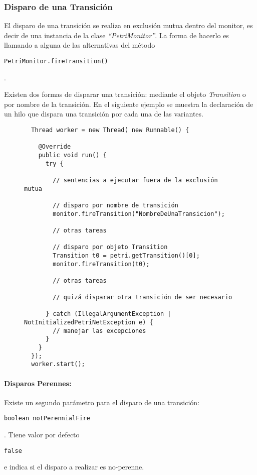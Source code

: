 \subsubsection{Disparo de una Transición}

El disparo de una transición se realiza en exclusión mutua dentro del monitor,
es decir de una instancia de la clase \textit{``PetriMonitor''}. La forma de
hacerlo es llamando a alguna de las alternativas del método
\begin{verbatim}
PetriMonitor.fireTransition()
\end{verbatim}.

Existen dos formas de disparar una transición: mediante el objeto
\textit{Transition} o por nombre de la transición.
En el siguiente ejemplo se muestra la declaración de un hilo que dispara una
transición por cada una de las variantes.

\begin{figure}[H]
\centering
\begin{verbatim}
  Thread worker = new Thread( new Runnable() {
  
    @Override
    public void run() {
      try {
      
        // sentencias a ejecutar fuera de la exclusión mutua

        // disparo por nombre de transición
        monitor.fireTransition("NombreDeUnaTransicion");

        // otras tareas

        // disparo por objeto Transition
        Transition t0 = petri.getTransition()[0];
        monitor.fireTransition(t0);
      
        // otras tareas
      
        // quizá disparar otra transición de ser necesario

      } catch (IllegalArgumentException | NotInitializedPetriNetException e) {
        // manejar las excepciones
      }
    }
  });
  worker.start();
\end{verbatim}
\end{figure}

\paragraph{Disparos Perennes:}
Existe un segundo parámetro para el disparo de una transición: {
\begin{verbatim}
boolean notPerennialFire
\end{verbatim}
}. Tiene valor por defecto {
\begin{verbatim}
false
\end{verbatim}
} e indica si el disparo a realizar es no-perenne.

